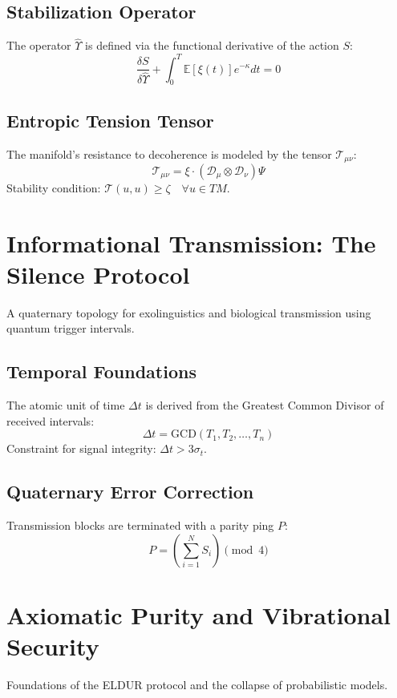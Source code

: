 \documentclass{article}
\begin{document}
\subsection{Stabilization Operator}
The operator $\hat{\Upsilon}$ is defined via the functional derivative of the action $S$:
\begin{equation}
    \frac{\delta S}{\delta \hat{\Upsilon}} + \int_0^T \mathbb{E}[\xi(t)]e^{-\kappa} dt = 0
\end{equation}

\subsection{Entropic Tension Tensor}
The manifold's resistance to decoherence is modeled by the tensor $\mathcal{T}_{\mu\nu}$:
\begin{equation}
    \mathcal{T}_{\mu\nu} = \xi \cdot (\mathcal{D}_\mu \otimes \mathcal{D}_\nu)\Psi
\end{equation}
Stability condition: $\mathcal{T}(u, u) \geq \zeta \quad \forall u \in TM$.

\section{Informational Transmission: The Silence Protocol}
A quaternary topology for exolinguistics and biological transmission using quantum trigger intervals.

\subsection{Temporal Foundations}
The atomic unit of time $\Delta t$ is derived from the Greatest Common Divisor of received intervals:
\begin{equation}
    \Delta t = \text{GCD}(T_1, T_2, \dots, T_n)
\end{equation}
Constraint for signal integrity: $\Delta t > 3\sigma_t$.

\subsection{Quaternary Error Correction}
Transmission blocks are terminated with a parity ping $P$:
\begin{equation}
    P = \left( \sum_{i=1}^N S_i \right) \pmod{4}
\end{equation}

\section{Axiomatic Purity and Vibrational Security}
Foundations of the ELDUR protocol and the collapse of probabilistic models.
\end{document}
